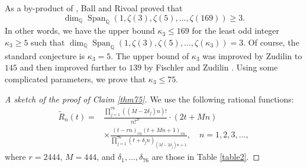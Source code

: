 \documentclass[12pt]{article}
\numberwithin{equation}{section}
\begin{document}
\bigskip
\bigskip

As a by-product of \cite{BR2001}, Ball and Rivoal proved that
\[ \dim_{\mathbb{Q}}\operatorname{Span}_{\mathbb{Q}}\left( 1,\zeta(3),\zeta(5),\ldots,\zeta(169) \right) \geqslant 3. \]
In other words, we have the upper bound $\kappa_3 \leqslant 169$ for the least odd integer $\kappa_3 \geqslant 5$ such that $\dim_{\mathbb{Q}}\operatorname{Span}_{\mathbb{Q}}\left( 1,\zeta(3),\zeta(5),\ldots,\zeta(\kappa_3) \right) = 3$. Of course, the standard conjecture is $\kappa_3=5$. The upper bound of $\kappa_3$ was improved by Zudilin \cite{Zud2002} to $145$ and then improved further to $139$ by Fischler and Zudilin \cite{FZ2010}. Using some complicated parameters, we prove that $\kappa_3 \leqslant 75$.

\begin{proof}[A sketch of the proof of Claim \ref{thm75}]
We use the following rational functions:
\begin{align*}
	\widetilde{R}_n(t) = &\frac{\prod_{j=1}^{76} ((M-2\delta_j)n)!}{ n!^{2r}} \cdot(2t+Mn)\\
	 &\times \frac{(t-rn)_{rn} (t+Mn+1)_{rn}}{\prod_{j=1}^{76}(t+\delta_jn)_{(M - 2\delta_j)n+1}}, \quad n=1,2,3,\ldots,
\end{align*}
where $r = 2444$, $M=444$, and $\delta_1,\ldots,\delta_{76}$ are those in Table  \ref{table2}.


\end{proof}
\end{document}
